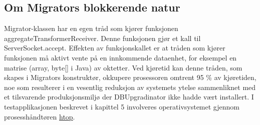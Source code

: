 \subsection{Om Migrators blokkerende natur}

Migrator-klassen har en egen tråd som kjører funksjonen aggregateTransformerReceiver. Denne funksjonen gjør et kall til ServerSocket.accept. Effekten av funksjonskallet er at tråden som kjører funksjonen må aktivt vente på en innkommende dataenhet, for eksempel en matrise (array, byte[] i Java) av oktetter. Ved kjøretid kan denne tråden, som skapes i Migrators konstruktør, okkupere prosessoren omtrent 95 \% av kjøretiden, noe som resulterer i en vesentlig reduksjon av systemets ytelse sammenliknet med et tilsvarende produksjonsmiljø der DBUpgradinator ikke hadde vært installert. I testapplikasjonen beskrevet i kapittel 5 involveres operativsystemet gjennom prosesshåndtøren \underline{htop}.

